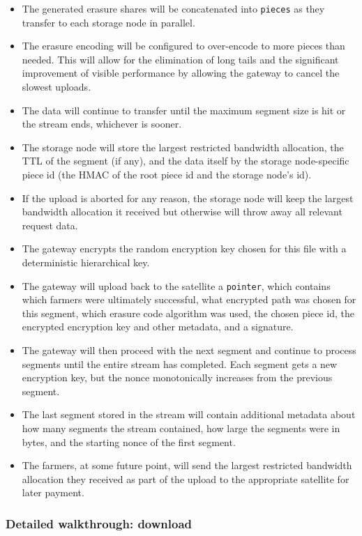 \documentclass[a4paper,10pt]{article} \usepackage[utf8]{inputenc}
\newcommand{\x}[1]{{\tt #1}} \newcommand{\code}[1]{{\tt #1}}
\begin{document}
\begin{itemize}
\item The generated erasure shares will be concatenated into \x{pieces} as they
  transfer to each storage node in parallel.
\item The erasure encoding will be configured to over-encode to more pieces
  than needed. This will allow for the elimination of long tails and the
  significant improvement of visible performance by allowing the gateway to
  cancel the slowest uploads.
\item The data will continue to transfer until the maximum segment size is hit
  or the stream ends, whichever is sooner.
\item The storage node will store the largest restricted bandwidth allocation, 
the
  TTL of the segment (if any), and the data itself by the storage node-specific 
  piece
  id (the HMAC of the root piece id and the storage node's id).
\item If the upload is aborted for any reason, the storage node will keep the
  largest bandwidth allocation it received but otherwise will throw away all
  relevant request data.
\item The gateway encrypts the random encryption key chosen for this file
  with a deterministic hierarchical key.
\item The gateway will upload back to the satellite a \x{pointer}, which
  contains which farmers were
  ultimately successful, what encrypted path was chosen for this segment, which
  erasure code algorithm was used, the chosen piece id, the
  encrypted encryption key and other metadata, and a signature.
\item The gateway will then proceed with the next segment and continue to
  process segments until the entire stream has completed. Each segment gets
  a new encryption key, but the nonce monotonically increases from the previous
  segment.
\item The last segment stored in the stream will contain additional metadata
  about how many segments the stream contained, how large the segments were
  in bytes, and the starting nonce of the first segment.
\item The farmers, at some future point, will send the largest restricted
  bandwidth allocation they received as part of the upload to the appropriate
  satellite for later payment.
\end{itemize}

\subsubsection{Detailed walkthrough: download}
\end{document}
